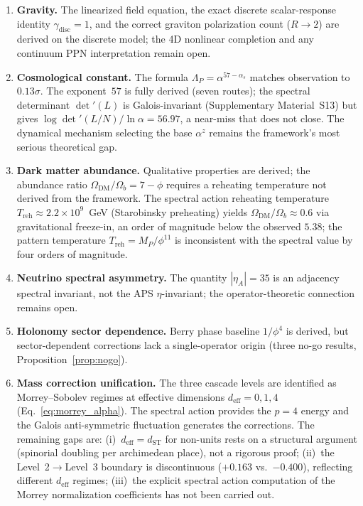 \documentclass[12pt,a4paper]{article}
\theoremstyle{definition}
\begin{document}
\begin{enumerate}
\item \textbf{Gravity.} The linearized field equation, the exact discrete scalar-response identity $\gamma_{\mathrm{disc}} = 1$, and the correct graviton polarization count ($R \to 2$) are derived on the discrete model; the 4D nonlinear completion and any continuum PPN interpretation remain open.
\item \textbf{Cosmological constant.} The formula $\Lambda_P = \alpha^{57-\alpha_s}$ matches observation to $0.13\sigma$.  The exponent~$57$ is fully derived (seven routes); the spectral determinant $\det'(L)$ is Galois-invariant (Supplementary Material~S13) but gives $\log\det'(L/N)/\ln\alpha = 56.97$, a near-miss that does not close.  The dynamical mechanism selecting the base $\alpha^z$ remains the framework's most serious theoretical gap.
\item \textbf{Dark matter abundance.} Qualitative properties are derived; the abundance ratio $\Omega_{\text{DM}}/\Omega_b = 7-\phi$ requires a reheating temperature not derived from the framework.  The spectral action reheating temperature $T_{\text{reh}} \approx 2.2 \times 10^9$~GeV (Starobinsky preheating) yields $\Omega_{\text{DM}}/\Omega_b \approx 0.6$ via gravitational freeze-in, an order of magnitude below the observed $5.38$; the pattern temperature $T_{\text{reh}} = M_P/\phi^{11}$ is inconsistent with the spectral value by four orders of magnitude.
\item \textbf{Neutrino spectral asymmetry.} The quantity $|\eta_A| = 35$ is an adjacency spectral invariant, not the APS $\eta$-invariant; the operator-theoretic connection remains open.
\item \textbf{Holonomy sector dependence.} Berry phase baseline $1/\phi^4$ is derived, but sector-dependent corrections lack a single-operator origin (three no-go results, Proposition~\ref{prop:nogo}).
\item \textbf{Mass correction unification.} The three cascade levels are identified as Morrey--Sobolev regimes at effective dimensions $d_{\text{eff}} = 0, 1, 4$ (Eq.~\ref{eq:morrey_alpha}).  The spectral action provides the $p = 4$ energy and the Galois anti-symmetric fluctuation generates the corrections.  The remaining gaps are: (i)~$d_{\text{eff}} = d_{\text{ST}}$ for non-units rests on a structural argument (spinorial doubling per archimedean place), not a rigorous proof; (ii)~the Level~2$\to$Level~3 boundary is discontinuous ($+0.163$ vs.\ $-0.400$), reflecting different $d_{\text{eff}}$ regimes; (iii)~the explicit spectral action computation of the Morrey normalization coefficients has not been carried out.
\end{enumerate}
\end{document}

